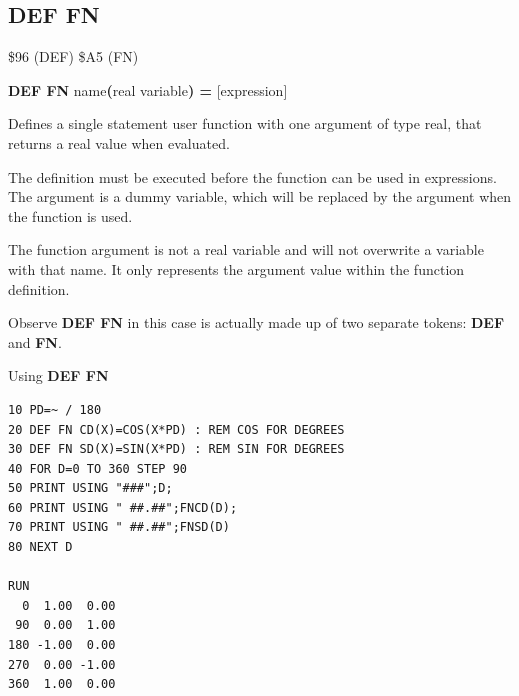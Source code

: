 \subsection{DEF FN}
\begin{description}[leftmargin=2cm,style=nextline]
\item [Token:]   \$96 (DEF) \$A5 (FN)

\item [Format:]  {\bf DEF FN} name{\bf(}real variable{\bf) =} [expression]

\item [Usage:]   Defines a single statement user function with one argument of type real, that returns a real value when evaluated.

                 The definition must be executed before the function can be used in expressions. The argument is a dummy variable, which will be replaced by the argument when the function is used.

\item [Remarks:] The function argument is not a real variable and will not overwrite a variable with that name. It only represents the argument value within the function definition.

                 Observe {\bf DEF FN} in this case is actually made up of two separate tokens: {\bf DEF} and {\bf FN}.

\item [Example:] Using {\bf DEF FN}

\begin{tcolorbox}[colback=black,coltext=white]
\verbatimfont{\codefont}
\begin{verbatim}
10 PD=~ / 180
20 DEF FN CD(X)=COS(X*PD) : REM COS FOR DEGREES
30 DEF FN SD(X)=SIN(X*PD) : REM SIN FOR DEGREES
40 FOR D=0 TO 360 STEP 90
50 PRINT USING "###";D;
60 PRINT USING " ##.##";FNCD(D);
70 PRINT USING " ##.##";FNSD(D)
80 NEXT D

RUN
  0  1.00  0.00
 90  0.00  1.00
180 -1.00  0.00
270  0.00 -1.00
360  1.00  0.00
\end{verbatim}
\end{tcolorbox}
\end{description}


\newpage
